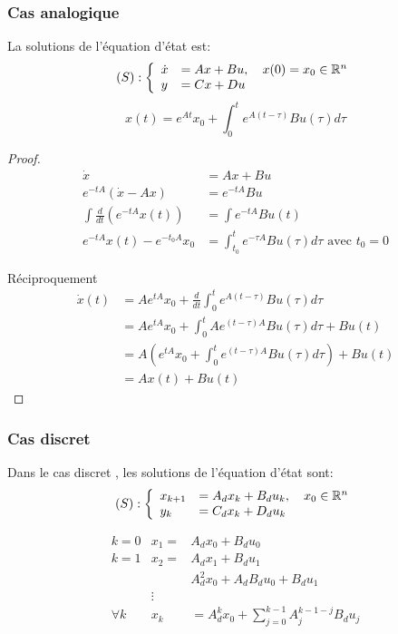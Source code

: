 \documentclass[main.tex]{subfiles}
\begin{document}
\subsubsection{Cas analogique}
\begin{thm}
  La solutions de l'équation d'état est:
\[ (S) :
\left\{
\begin{array}{ll}
\dot{x} &= Ax + Bu, \quad x(0)=x_0 \in \mathbb{R}^n \\
y & = Cx+Du
\end{array}
\right.
\]
\[ x(t) = e^{At}x_0 + \int_0^t e^{A(t-\tau)}Bu(\tau)d\tau \]
\end{thm}
\begin{proof}
\begin{align*}
\dot{x} & = Ax + Bu \\
e^{-tA}(\dot{x} - Ax) & = e^{-tA}Bu\\
\int \frac{d}{dt}(e^{-tA}x(t))  & = \int e^{-tA}Bu(t) \\
e^{-tA}x(t)-e^{-t_0A}x_0 & = \int_{t_0}^t e^{-\tau A}Bu(\tau)d\tau \text{ avec } t_0=0
\end{align*}

Réciproquement
\begin{align*}
\dot{x}(t) & = Ae^{tA}x_0 + \frac{d}{dt} \int_0^t e^{A(t-\tau)}Bu(\tau)d\tau \\
& = Ae^{tA}x_0 + \int_0^t Ae^{(t-\tau)A} Bu(\tau)d\tau + Bu(t) \\
& = A(e^{tA}x_0 + \int_0^t e^{(t-\tau)A} Bu(\tau)d\tau) + Bu(t) \\
& = Ax(t) + Bu(t)
\end{align*}
\end{proof}

\subsubsection{Cas discret}
\begin{thm}
Dans le cas discret , les solutions de l'équation d'état sont:
  \[ (S) :
\left\{
\begin{array}{ll}
x_{k+1} &= A_dx_k + B_du_k, \quad x_0 \in \mathbb{R}^n \\
y_k & = C_dx_k+D_du_k
\end{array}
\right.
\]
\end{thm}
\[
\begin{array}{c|ll}
k=0 & x_1 = & A_dx_0 + B_du_0 \\
k=1 & x_2 = & A_dx_1 + B_du_1 \\
& & A_d^2x_0 + A_dB_du_0 + B_du_1 \\
& \vdots \\
\forall k & x_k & = A_d^k x_0 + \sum_{j=0}^{k-1}A_j^{k-1-j}B_du_j
\end{array}
\]
\end{document}
